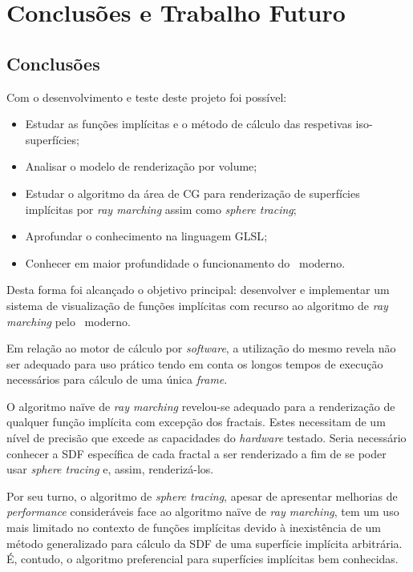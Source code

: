 \chapter{Conclusões e Trabalho Futuro}
\label{ch::conc}

\section{Conclusões}
\label{sec::conc:conc}

Com o desenvolvimento e teste deste projeto foi possível:
\begin{itemize}
    \item Estudar as funções implícitas e o método de cálculo das respetivas iso-superfícies;
    \item Analisar o modelo de renderização por volume;
    \item Estudar o algoritmo da área de \ac{CG} para renderização de superfícies implícitas por \textit{ray marching} assim como \textit{sphere tracing};
    \item Aprofundar o conhecimento na linguagem \ac{GLSL};
    \item Conhecer em maior profundidade o funcionamento do \opengl~moderno.
\end{itemize}

Desta forma foi alcançado o objetivo principal: desenvolver e implementar um sistema de visualização de funções implícitas com recurso ao algoritmo de \textit{ray marching} pelo \opengl~moderno.

Em relação ao motor de cálculo por \textit{software}, a utilização do mesmo revela não ser adequado para uso prático tendo em conta os longos tempos de execução necessários para cálculo de uma única \textit{frame}.

O algoritmo naïve de \textit{ray marching} revelou-se adequado para a renderização de qualquer função implícita com excepção dos fractais. Estes necessitam de um nível de precisão que excede as capacidades do \textit{hardware} testado. Seria necessário conhecer a \acs{SDF} específica de cada fractal a ser renderizado a fim de se poder usar \textit{sphere tracing} e, assim, renderizá-los.

Por seu turno, o algoritmo de \textit{sphere tracing}, apesar de apresentar melhorias de \textit{performance} consideráveis face ao algoritmo naïve de \textit{ray marching}, tem um uso mais limitado no contexto de funções implícitas devido à inexistência de um método generalizado para cálculo da \acf{SDF} de uma superfície implícita arbitrária. É, contudo, o algoritmo preferencial para superfícies implícitas bem conhecidas.


